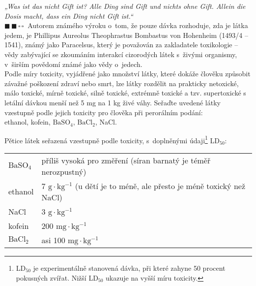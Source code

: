 \documentclass{book}
\newcommand{\dva}{$\blacksquare \, \blacksquare \, \square \, \square \; \; $}
\renewenvironment{quotation}{\par}{\par} %
\begin{document}
\hrulefill %
\begin{quotation}
\textit{„Was ist das nicht Gift ist? Alle Ding sind Gift und nichts ohne Gift.
Allein die Dosis macht, dass ein Ding nicht Gift ist.“}\\
\dva Autorem známého
výroku o~tom, že pouze dávka rozhoduje, zda je látka jedem, je Phillipus
Aureolus Theophrastus Bombastus von Hohenheim (1493/4 -- 1541), známý jako Paracelsus,
který je považován za zakladatele toxikologie -- vědy zabývající
se zkoumáním interakcí cizorodých látek s~živými organismy, v~širším
povědomí známé jako vědy o~jedech.\\
Podle míry toxicity, vyjádřené
jako množství látky, které dokáže člověku způsobit závažné poškození
zdraví nebo smrt, lze látky rozdělit na prakticky netoxické, málo
toxické, mírně toxické, silně toxické, extrémně toxické a tzv. supertoxické
s letální dávkou menší než 5 mg na 1 kg živé váhy. Seřaďte uvedené
látky vzestupně podle jejich toxicity pro člověka při perorálním podání:\\
ethanol, kofein, $\mathrm{BaSO_{4}}$, $\mathrm{BaCl_{2}}$, NaCl.
\end{quotation} \dotfill \par 
Pětice látek seřazená vzestupně podle toxicity, s~doplněnými údaji\footnote{LD$_{50}$ je experimentálně stanovená dávka, při které zahyne 50 procent pokusných zvířat. Nižší LD$_{50}$ ukazuje na vyšší míru toxicity.} LD$_{50}$:\ 


\begin{center}
\begin{tabular}{ll}
$\mathrm{BaSO_{4}}$ & příliš vysoká pro změření (síran barnatý je téměř nerozpustný)\tabularnewline
ethanol & 7 $\mathrm{g\cdot kg^{-1}}$ (u dětí je to méně, ale přesto je méně toxický než NaCl)\tabularnewline
NaCl & 3 $\mathrm{g\cdot kg^{-1}}$\tabularnewline
kofein & 200 $\mathrm{mg\cdot kg^{-1}}$\tabularnewline
$\mathrm{BaCl_{2}}$ & asi 100 $\mathrm{mg\cdot kg^{-1}}$
\end{tabular}
\end{center}
\end{document}
